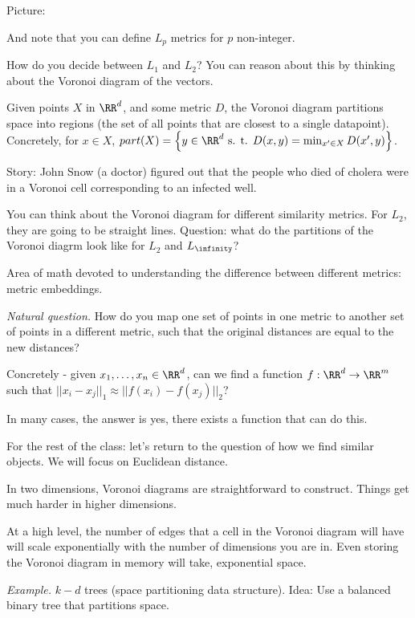 Picture:

And note that you can define $L_p$ metrics for $p$ non-integer.

How do you decide between $L_1$ and $L_2$?  You can reason about this by thinking about the Voronoi diagram of the vectors.

\begin{definition}
  Given points $X$ in $\RR^d$, and some metric $D$, the Voronoi diagram partitions space into regions (the set of all points that are closest to a single datapoint).  Concretely, for $x \in X$, $part(X) = \left\{ y \in \RR^d \text{ s. t. } D(x, y) = \min_{x' \in X} D(x', y) \right\}$.
\end{definition}

Story: John Snow (a doctor) figured out that the people who died of cholera were in a Voronoi cell corresponding to an infected well.

You can think about the Voronoi diagram for different similarity metrics.  For $L_2$, they are going to be straight lines.  Question: what do the partitions of the Voronoi diagrm look like for $L_2$ and $L_\infinity$?

Area of math devoted to understanding the difference between different metrics: metric embeddings.

{\it Natural question.} How do you map one set of points in one metric to another set of points in a different metric, such that the original distances are equal to the new distances?

Concretely - given $x_1, \dots, x_n \in \RR^d$, can we find a function $f: \RR^d \to \RR^m$ such that $||x_i - x_j||_1 \approx ||f(x_i) - f(x_j)||_2$?

In many cases, the answer is yes, there exists a function that can do this.

For the rest of the class: let's return to the question of how we find similar objects.  We will focus on Euclidean distance.

In two dimensions, Voronoi diagrams are straightforward to construct.  Things get much harder in higher dimensions.

At a high level, the number of edges that a cell in the Voronoi diagram will have will scale exponentially with the number of dimensions you are in. Even storing the Voronoi diagram in memory will take, exponential space.

{\it Example.} $k-d$ trees (space partitioning data structure). Idea: Use a balanced binary tree that partitions space.

